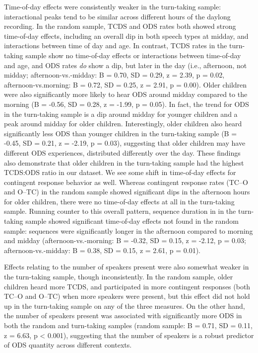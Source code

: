 \documentclass[floatsintext,man]{apa6}
\theoremstyle{definition}
\theoremstyle{definition}
\theoremstyle{definition}
\theoremstyle{remark}
\begin{document}
Time-of-day effects were consistently weaker in the turn-taking sample:
interactional peaks tend to be similar across different hours of the
daylong recording. In the random sample, TCDS and ODS rates both showed
strong time-of-day effects, including an overall dip in both speech
types at midday, and interactions between time of day and age. In
contrast, TCDS rates in the turn-taking sample show no time-of-day
effects or interactions between time-of-day and age, and ODS rates
\emph{do} show a dip, but later in the day (i.e., afternoon, not midday;
afternoon-vs.-midday: B = 0.70, SD = 0.29, z = 2.39, p = 0.02,
afternoon-vs.morning: B = 0.72, SD = 0.25, z = 2.91, p = 0.00). Older
children were also significantly more likely to hear ODS around midday
compared to the morning (B = -0.56, SD = 0.28, z = -1.99, p = 0.05). In
fact, the trend for ODS in the turn-taking sample is a dip around midday
for younger children and a peak around midday for older children.
Interestingly, older children also heard significantly less ODS than
younger children in the turn-taking sample (B = -0.45, SD = 0.21, z =
-2.19, p = 0.03), suggesting that older children may have different ODS
experiences, distributed differently over the day. These findings also
demonstrate that older children in the turn-taking sample had the
highest TCDS:ODS ratio in our dataset. We see some shift in time-of-day
effects for contingent response behavior as well. Whereas contingent
response rates (TC--O and O--TC) in the random sample showed significant
dips in the afternoon hours for older children, there were no
time-of-day effects at all in the turn-taking sample. Running counter to
this overall pattern, sequence duration in in the turn-taking sample
showed significant time-of-day effects not found in the random sample:
sequences were significantly longer in the afternoon compared to morning
and midday (afternoon-vs.-morning: B = -0.32, SD = 0.15, z = -2.12, p =
0.03; afternoon-vs.-midday: B = 0.38, SD = 0.15, z = 2.61, p = 0.01).

Effects relating to the number of speakers present were also somewhat
weaker in the turn-taking sample, though inconsistently. In the random
sample, older children heard more TCDS, and participated in more
contingent responses (both TC--O and O--TC) when more speakers were
present, but this effect did not hold up in the turn-taking sample on
any of the three measures. On the other hand, the number of speakers
present was associated with significantly more ODS in both the random
and turn-taking samples (random sample: B = 0.71, SD = 0.11, z = 6.63, p
\textless{} 0.001), suggesting that the number of speakers is a robust
predictor of ODS quantity across different contexts.
\end{document}
